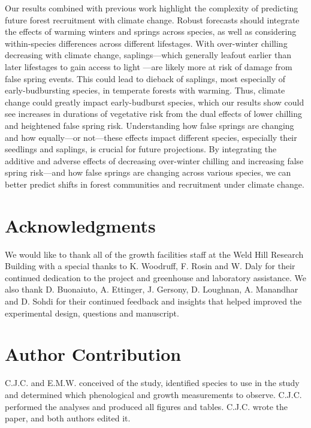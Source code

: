 \documentclass{article}\usepackage[]{graphicx}\usepackage[]{color}
\begin{document}
Our results combined with previous work highlight the complexity of predicting future forest recruitment with climate change. Robust forecasts should integrate the effects of warming winters and springs across species, as well as considering within-species differences across different lifestages. With over-winter chilling decreasing with climate change, saplings---which generally leafout earlier than later lifestages to gain access to light \citep{Augspurger2009}---are likely more at risk of damage from false spring events. This could lead to dieback of saplings, most especially of early-budbursting species, in temperate forests with warming. Thus, climate change could greatly impact early-budburst species, which our results show could see increases in durations of vegetative risk from the dual effects of lower chilling and heightened false spring risk. Understanding how false springs are changing and how equally---or not---these effects impact different species, especially their seedlings and saplings, is crucial for future projections. By integrating the additive and adverse effects of decreasing over-winter chilling and increasing false spring risk---and how false springs are changing across various species, we can better predict shifts in forest communities and recruitment under climate change. 

\section*{Acknowledgments}
We would like to thank all of the growth facilities staff at the Weld Hill Research Building with a special thanks to K. Woodruff, F. Rosin and W. Daly for their continued dedication to the project and greenhouse and laboratory assistance. We also thank D. Buonaiuto, A. Ettinger, J. Gersony, D. Loughnan, A. Manandhar and D. Sohdi for their continued feedback and insights that helped improved the experimental design, questions and manuscript.

\section*{Author Contribution} 
C.J.C. and E.M.W. conceived of the study, identified species to use in the study and determined which phenological and growth measurements to observe. C.J.C. performed the analyses and produced all figures and tables. C.J.C. wrote the paper, and both authors edited it.
\end{document}
